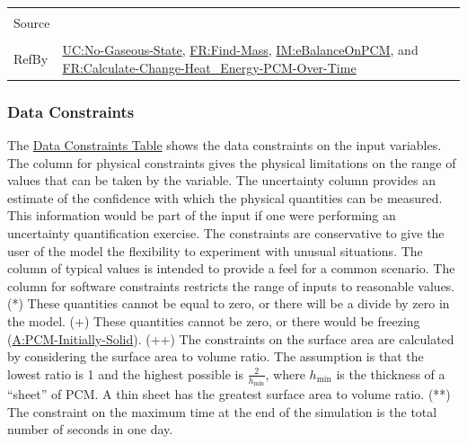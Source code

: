 \documentclass[12pt]{article}
\begin{document}
\begin{minipage}{\textwidth}
\begin{tabular}{>{\raggedright}p{}>{\raggedright\arraybackslash}p{}}
\\ \midrule \\
Source & \cite{koothoor2013}
         
\\ \midrule \\
RefBy & \hyperref[unlikeChgNGS]{UC:No-Gaseous-State}, \hyperref[findMass]{FR:Find-Mass}, \hyperref[IM:eBalanceOnPCM]{IM:eBalanceOnPCM}, and \hyperref[calcChgHeatEnergyPCMOverTime]{FR:Calculate-Change-Heat\_Energy-PCM-Over-Time}
        
\\ \bottomrule
\end{tabular}
\end{minipage}

\subsubsection{Data Constraints}
\label{Sec:DataConstraints}
The \hyperref[Table:InDataConstraints]{Data Constraints Table} shows the data constraints on the input variables. The column for physical constraints gives the physical limitations on the range of values that can be taken by the variable. The uncertainty column provides an estimate of the confidence with which the physical quantities can be measured. This information would be part of the input if one were performing an uncertainty quantification exercise. The constraints are conservative to give the user of the model the flexibility to experiment with unusual situations. The column of typical values is intended to provide a feel for a common scenario. The column for software constraints restricts the range of inputs to reasonable values. (*) These quantities cannot be equal to zero, or there will be a divide by zero in the model. (+) These quantities cannot be zero, or there would be freezing (\hyperref[assumpPIS]{A:PCM-Initially-Solid}). (++) The constraints on the surface area are calculated by considering the surface area to volume ratio. The assumption is that the lowest ratio is 1 and the highest possible is $\frac{2}{{h_{\text{min}}}}$, where ${h_{\text{min}}}$ is the thickness of a ``sheet'' of PCM. A thin sheet has the greatest surface area to volume ratio. (**) The constraint on the maximum time at the end of the simulation is the total number of seconds in one day.
\end{document}
